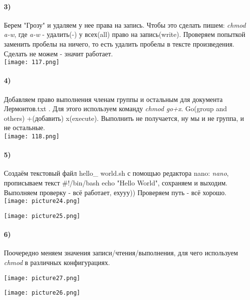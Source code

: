 		\paragraph{3)}
		Берем "Грозу" и удаляем у нее права на запись. Чтобы это сделать пишем: 		\textit{chmod a-w}, где \textit{a-w} - удалить(-) у всех(all) право на 				запись(write). Проверяем попыткой заменить пробелы на ничего, то есть удалить 		пробелы в тексте произведения. Сделать не можем - значит работает.\\
	\texttt{[image: 117.png]}
	\\
	
		\paragraph{4)}
		Добавляем право выполнения членам группы и остальным  для документа 			Лермонтов.txt . Для этого используем команду \textit{chmod go+x}. Go(group and 		others) +(добавить) x(execute). Выполнить не получается, ну мы и не группа, и 		не остальные.\\
	\texttt{[image: 118.png]}
	\\
		\paragraph{5)}
		Создаём текстовый файл hello\_ world.sh с помощью редактора nano: 				\textit{nano}, прописываем текст \#!/bin/bash echo "Hello World", сохраняем и 		выходим. Выполняем проверку - всё работает, ехууу)) Проверяем путь - всё хорошо.		\\
	\texttt{[image: picture24.png]}
	\begin{center}
		\texttt{[image: picture25.png]}
	\end{center}
	
		\paragraph{6)}
		Поочередно меняем значения записи/чтения/выполнения, для чего используем 		\textit{chmod} в различных конфигурациях.\\
		\begin{center}
			\texttt{[image: picture27.png]}
		\end{center}
		\vspace{0.1cm}
		\begin{center}
			\texttt{[image: picture26.png]}
		\end{center}
		


	  
	  
	  
		